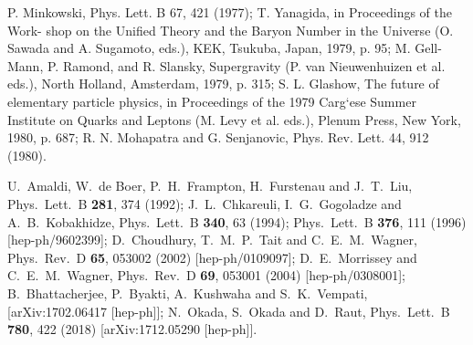 \documentclass[aps,prd,preprint,superscriptaddress,showpacs,ctexart]{revtex4-1}
\begin{document}
\begin{thebibliography}{10}


 P. Minkowski, Phys. Lett. B 67, 421 (1977); T. Yanagida,
in Proceedings of the Work- shop on the Unified Theory and the Baryon
Number in the Universe (O. Sawada and A. Sugamoto, eds.), KEK, Tsukuba,
Japan, 1979, p. 95; M. Gell-Mann, P. Ramond, and R. Slansky, Supergravity
(P. van Nieuwenhuizen et al. eds.), North Holland, Amsterdam, 1979,
p. 315; S. L. Glashow, The future of elementary particle physics,
in Proceedings of the 1979 Carg`ese Summer Institute on Quarks and
Leptons (M. L\textasciiacute evy et al. eds.), Plenum Press, New York,
1980, p. 687; R. N. Mohapatra and G. Senjanovi\textasciiacute c, Phys.
Rev. Lett. 44, 912 (1980).


 U.~Amaldi, W.~de Boer, P.~H.~Frampton, H.~Furstenau and J.~T.~Liu,
 Phys.\ Lett.\ B \textbf{281}, 374 (1992); %
 J.~L.~Chkareuli, I.~G.~Gogoladze and A.~B.~Kobakhidze, %
 Phys.\ Lett.\ B \textbf{340}, 63 (1994); %
 Phys.\ Lett.\ B \textbf{376}, 111 (1996) %
 {[}hep-ph/9602399{]}; %
 D.~Choudhury, T.~M.~P.~Tait and C.~E.~M.~Wagner, %
 Phys.\ Rev.\ D \textbf{65}, 053002 (2002) %
 {[}hep-ph/0109097{]}; %
 D.~E.~Morrissey and C.~E.~M.~Wagner, %
 Phys.\ Rev.\ D \textbf{69}, 053001 (2004) %
 {[}hep-ph/0308001{]}; %
 B.~Bhattacherjee, P.~Byakti, A.~Kushwaha and S.~K.~Vempati,
 {[}arXiv:1702.06417 {[}hep-ph{]}{]}; %
 N.~Okada, S.~Okada and D.~Raut, %
 Phys.\ Lett.\ B \textbf{780}, 422 (2018) %
 {[}arXiv:1712.05290 {[}hep-ph{]}{]}.


\end{thebibliography}
\end{document}
